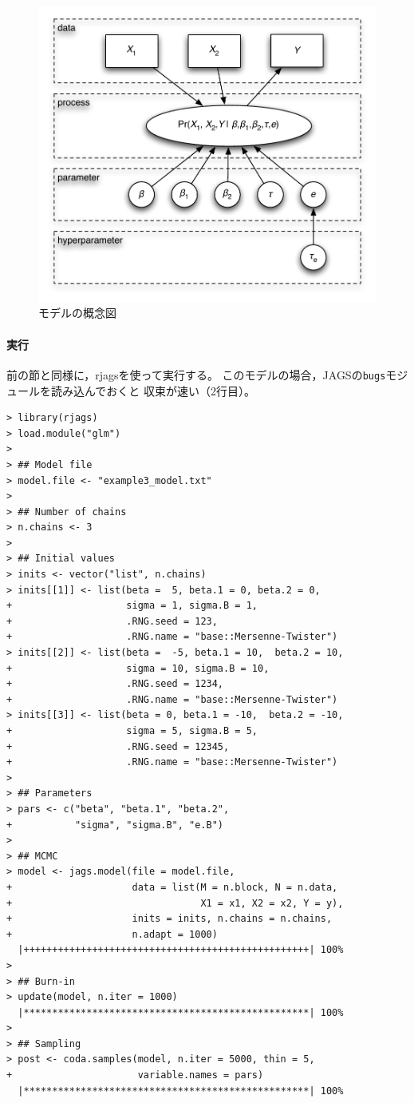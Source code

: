 \documentclass[11pt,uplatex]{jsarticle}
\begin{document}
\begin{figure}[htbp]
	\begin{center}
		\includegraphics[bb=0 0 440 384, clip, width=280 bp]{example3_schema.pdf}
	\end{center}
	\caption{モデルの概念図}
	\label{example3_schema}
\end{figure}


\paragraph{実行}

前の節と同様に，\textsf{rjags}を使って実行する。
このモデルの場合，\textsf{JAGS}の\texttt{bugs}モジュールを読み込んでおくと
収束が速い（2行目）。

\begin{lstlisting}
> library(rjags)
> load.module("glm")
>
> ## Model file
> model.file <- "example3_model.txt"
> 
> ## Number of chains
> n.chains <- 3
> 
> ## Initial values
> inits <- vector("list", n.chains)
> inits[[1]] <- list(beta =  5, beta.1 = 0, beta.2 = 0,
+                    sigma = 1, sigma.B = 1,
+                    .RNG.seed = 123,
+                    .RNG.name = "base::Mersenne-Twister")
> inits[[2]] <- list(beta =  -5, beta.1 = 10,  beta.2 = 10,
+                    sigma = 10, sigma.B = 10,
+                    .RNG.seed = 1234,
+                    .RNG.name = "base::Mersenne-Twister")
> inits[[3]] <- list(beta = 0, beta.1 = -10,  beta.2 = -10,
+                    sigma = 5, sigma.B = 5,
+                    .RNG.seed = 12345,
+                    .RNG.name = "base::Mersenne-Twister")
> 
> ## Parameters
> pars <- c("beta", "beta.1", "beta.2",
+           "sigma", "sigma.B", "e.B")
> 
> ## MCMC
> model <- jags.model(file = model.file,
+                     data = list(M = n.block, N = n.data,
+                                 X1 = x1, X2 = x2, Y = y),
+                     inits = inits, n.chains = n.chains,
+                     n.adapt = 1000)
  |++++++++++++++++++++++++++++++++++++++++++++++++++| 100%
>
> ## Burn-in
> update(model, n.iter = 1000)
  |**************************************************| 100%
> 
> ## Sampling
> post <- coda.samples(model, n.iter = 5000, thin = 5,
+                      variable.names = pars)
  |**************************************************| 100%
\end{lstlisting}
\end{document}
